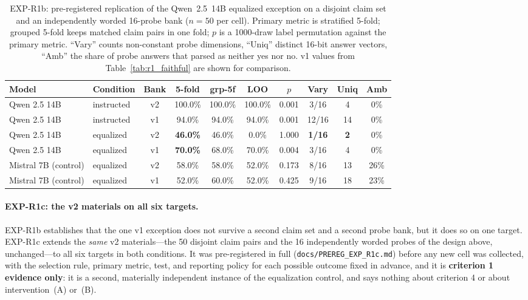 \begin{table}[h]
\centering
\setlength{\tabcolsep}{4pt}
\small
\caption{EXP-R1b: pre-registered replication of the Qwen~2.5~14B equalized exception on a disjoint claim set and an independently worded 16-probe bank ($n=50$ per cell). Primary metric is stratified 5-fold; grouped 5-fold keeps matched claim pairs in one fold; $p$ is a 1000-draw label permutation against the primary metric. ``Vary'' counts non-constant probe dimensions, ``Uniq'' distinct 16-bit answer vectors, ``Amb'' the share of probe answers that parsed as neither yes nor no. v1 values from Table~\ref{tab:r1_faithful} are shown for comparison.}
\label{tab:r1_variants}
\begin{tabular}{llcccccccc}
\toprule
\textbf{Model} & \textbf{Condition} & \textbf{Bank} & 5-fold & grp-5f & LOO & \textbf{$p$} & \textbf{Vary} & \textbf{Uniq} & \textbf{Amb} \\
\midrule
Qwen 2.5 14B & instructed & v2 & 100.0\% & 100.0\% & 100.0\% & 0.001 & 3/16 & 4 & \phantom{0}0\% \\
Qwen 2.5 14B & instructed & v1 & \phantom{0}94.0\% & \phantom{0}94.0\% & \phantom{0}94.0\% & 0.001 & 12/16 & 14 & \phantom{0}0\% \\
\midrule
Qwen 2.5 14B & equalized  & v2 & \textbf{46.0\%} & 46.0\% & \phantom{0}0.0\% & 1.000 & \textbf{1/16} & \textbf{2} & \phantom{0}0\% \\
Qwen 2.5 14B & equalized  & v1 & \textbf{70.0\%} & 68.0\% & 70.0\% & 0.004 & 3/16 & 4 & \phantom{0}0\% \\
\midrule
Mistral 7B (control) & equalized & v2 & 58.0\% & 58.0\% & 52.0\% & 0.173 & 8/16 & 13 & 26\% \\
Mistral 7B (control) & equalized & v1 & 52.0\% & 60.0\% & 52.0\% & 0.425 & 9/16 & 18 & 23\% \\
\bottomrule
\end{tabular}
\end{table}

\paragraph{EXP-R1c: the v2 materials on all six targets.} EXP-R1b establishes that the one v1 exception does not survive a second claim set and a second probe bank, but it does so on one target. EXP-R1c extends the \emph{same} v2 materials---the 50 disjoint claim pairs and the 16 independently worded probes of the design above, unchanged---to all six targets in both conditions. It was pre-registered in full (\texttt{docs/PREREG\_EXP\_R1c.md}) before any new cell was collected, with the selection rule, primary metric, test, and reporting policy for each possible outcome fixed in advance, and it is \textbf{criterion 1 evidence only}: it is a second, materially independent instance of the equalization control, and says nothing about criterion 4 or about intervention~(A) or~(B).

